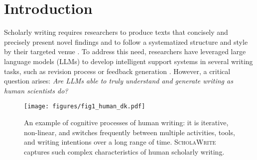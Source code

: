 \section{Introduction}

Scholarly writing requires researchers to produce texts that concisely and precisely present novel findings and to follow a systematized structure and style by their targeted venue \cite{jourdan2023text, kallestinova2011write, bourekkache2022english}. To address this need, researchers have leveraged large language models (LLMs) to develop intelligent support systems in several writing tasks, such as revision process \cite{du-etal-2022-understanding-iterative, kim-etal-2022-improving} or feedback generation \cite{liang2024can, lu2024ai}. However, a critical question arises: \textit{Are LLMs able to truly understand and generate writing as human scientists do?}




\begin{figure}[t]
    \centering   
    \vspace{-4mm}
    \texttt{[image: figures/fig1\_human\_dk.pdf]}
    \vspace{-6mm}
    \caption{An example of cognitive processes of human writing: it is iterative, non-linear, and switches frequently between multiple activities, tools, and writing intentions over a long range of time. \textsc{ScholaWrite} captures such complex characteristics of human scholarly writing.\vspace{-4mm}} 
    \label{fig:comparison-gpt4-human}
\end{figure}

